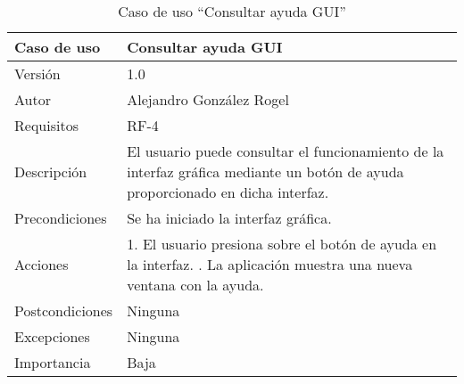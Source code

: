 \begin{table}
  \begin{center}
   \begin{tabular}{|>{} L{3cm} | L{9cm} |}
    \hline
    Caso de uso & Consultar ayuda GUI\\
    \hline
    Versión & 1.0 \\
    \hline
    Autor & Alejandro González Rogel \\
    \hline
    Requisitos & RF-4 \\
    \hline
    Descripción & El usuario puede consultar el funcionamiento de la interfaz gráfica mediante un botón de ayuda proporcionado en dicha interfaz.\\
    \hline
    Precondiciones & Se ha iniciado la interfaz gráfica. \\
    \hline
    Acciones & 1. El usuario presiona sobre el botón de ayuda en la interfaz. . La aplicación muestra una nueva ventana con la ayuda.\\
    \hline
    Postcondiciones & Ninguna \\
    \hline
    Excepciones & Ninguna \\
    \hline
    Importancia & Baja \\
    \hline
   \end{tabular}
   \caption{Caso de uso ``Consultar ayuda GUI''}
   \label{tabla:casoUso4}
  \end{center}
 \end{table}